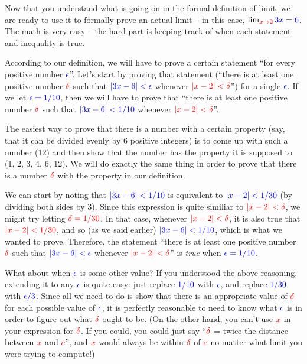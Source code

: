 \documentclass{myarticle}
\newcommand{\hor}[1]{\textcolor{red}{#1}}
\newcommand{\ver}[1]{\textcolor{blue}{#1}}
\theoremstyle{nospace}
\newtheorem{old series theorem}{Theorem}
\newenvironment{series theorem}
{\begin{mdframed}\begin{old series theorem}}
    {\end{old series theorem}\end{mdframed}}
\begin{document}
Now that you understand what is going on in the formal definition of
limit, we are ready to use it to formally prove an actual limit -- in
this case, $\lim_{\hor{x \to 2}} \ver{3x} = \ver{6}$. The math is very
easy -- the hard part is keeping track of when each statement and
inequality is true.

According to our definition, we will have to prove a certain statement
``for every positive number $\ver{\epsilon}$''. Let's start by proving
that statement (``there is at least one positive number $\hor{\delta}$
such that $\ver{|3x - 6| < \epsilon}$ whenever
$\hor{|x - 2| < \delta}$'') for a single $\ver{\epsilon}$. If we let
$\ver{\epsilon = 1/10}$, then we will have to prove that ``there is at
least one positive number $\hor{\delta}$ such that
$\ver{|3x - 6| < 1/10}$ whenever $\hor{|x - 2| < \delta}$''.

The easiest way to prove that there is a number with a certain
property (say, that it can be divided evenly by 6 positive integers)
is to come up with such a number (12) and then show that the number
has the property it is supposed to (1, 2, 3, 4, 6, 12). We will do
exactly the same thing in order to prove that there is a number
$\hor{\delta}$ with the property in our definition.

We can start by noting that $\ver{|3x - 6| < 1/10}$ is equivalent to
$\ver{|x - 2| < 1/30}$ (by dividing both sides by 3). Since this
expression is quite similiar to $\hor{|x - 2| < \delta}$, we might try
letting $\hor{\delta = 1/30}$. In that case, whenever
$\hor{|x - 2| < \delta}$, it is also true that $\hor{|x - 2| < 1/30}$,
and so (as we said earlier) $\ver{|3x - 6| < 1/10}$, which is what we
wanted to prove. Therefore, the statement ``there is at least one
positive number $\hor{\delta}$ such that $\ver{|3x - 6| < \epsilon}$
whenever $\hor{|x - 2| < \delta}$'' is \emph{true} when
$\ver{\epsilon = 1/10}$.

What about when $\ver{\epsilon}$ is some other value? If you
understood the above reasoning, extending it to any $\ver{\epsilon}$
is quite easy: just replace $\ver{1/10}$ with $\ver{\epsilon}$, and
replace $\ver{1/30}$ with $\ver{\epsilon/3}$. Since all we need to do
is show that there is an appropriate value of $\hor{\delta}$ for each
possible value of $\ver{\epsilon}$, it is perfectly reasonable to need
to know what $\ver{\epsilon}$ is in order to figure out what
$\hor{\delta}$ ought to be. (On the other hand, you can't use
$\hor{x}$ in your expression for $\hor{\delta}$. If you could, you
could just say ``$\hor{\delta}$ = twice the distance between $\hor{x}$
and $\hor{c}$'', and $\hor{x}$ would always be within $\hor{\delta}$
of $\hor{c}$ no matter what limit you were trying to compute!)
\end{document}
